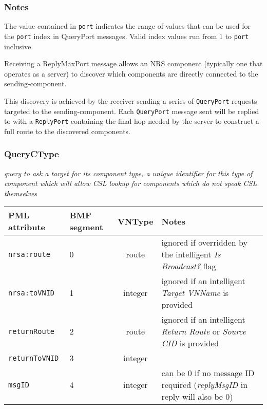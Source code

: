 \documentclass[pdftex,a4paper]{article}
\newcommand{\XMLfont}[1]{{\tt \small #1}}
\begin{document}
\subsubsection*{Notes}

The value contained in \XMLfont{port} indicates the range of values that
can be used for the \XMLfont{port} index in QueryPort messages. Valid
index values run from 1 to \XMLfont{port} inclusive.

Receiving a ReplyMaxPort message allows an NRS component (typically one
that operates as a server) to discover which components are directly
connected to the sending-component.

This discovery is achieved by the receiver sending a series of
\XMLfont{QueryPort} requests targeted to the sending-component. Each
\XMLfont{QueryPort} message sent will be replied to with a
\XMLfont{ReplyPort} containing the final hop needed by the server to
construct a full route to the discovered components.


\clearpage

\subsubsection{QueryCType}
{\em query to ask a target for its component type, a unique identifier
  for this type of component which will allow CSL lookup for components
  which do not speak CSL themselves}

\begin{table}[!h]
  \begin{center}
    \label{tab:QueryCType}
    \begin{tabular}{|l|p{13mm}|c|p{60mm}|}
      \hline

      \textbf{PML attribute} & \textbf{BMF segment} & \textbf{VNType}
      & \textbf{Notes} \\\hline

      \XMLfont{nrsa:route} & 0 & route & ignored if overridden by the
      intelligent {\em Is Broadcast?} flag \\\hline

      \XMLfont{nrsa:toVNID} & 1 & integer & ignored if an intelligent {\em
      Target VNName} is provided \\\hline

      \XMLfont{returnRoute} & 2 & route & ignored if an
      intelligent {\em Return Route} or {\em Source CID} is provided
      \\\hline

      \XMLfont{returnToVNID} & 3 & integer & \\\hline

      \XMLfont{msgID} & 4 & integer & can be 0 if no message ID
      required ({\em replyMsgID} in reply will also be 0) \\\hline

    \end{tabular}
  \end{center}
\end{table}
\end{document}
